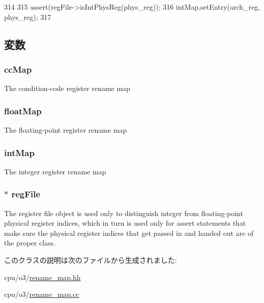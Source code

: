 \begin{DoxyCode}
314     {
315         assert(regFile->isIntPhysReg(phys_reg));
316         intMap.setEntry(arch_reg, phys_reg);
317     }
\end{DoxyCode}


\subsection{変数}
\hypertarget{classUnifiedRenameMap_a763b488cc757601419547ab2420f4fca}{
\subsubsection[{ccMap}]{ {\bf ccMap}}}
\label{classUnifiedRenameMap_a763b488cc757601419547ab2420f4fca}
The condition-\/code register rename map \hypertarget{classUnifiedRenameMap_a0850a3bd98051c123507bd1d971f5ea5}{
\subsubsection[{floatMap}]{ {\bf floatMap}}}
\label{classUnifiedRenameMap_a0850a3bd98051c123507bd1d971f5ea5}
The floating-\/point register rename map \hypertarget{classUnifiedRenameMap_a3133c6b943f6bd39859ab4544cb8099e}{
\subsubsection[{intMap}]{ {\bf intMap}}}
\label{classUnifiedRenameMap_a3133c6b943f6bd39859ab4544cb8099e}
The integer register rename map \hypertarget{classUnifiedRenameMap_a1cb63957414a6c5533e779b0e6e68dd7}{
\subsubsection[{regFile}]{$\ast$ {\bf regFile}}}
\label{classUnifiedRenameMap_a1cb63957414a6c5533e779b0e6e68dd7}
The register file object is used only to distinguish integer from floating-\/point physical register indices, which in turn is used only for assert statements that make sure the physical register indices that get passed in and handed out are of the proper class. 

このクラスの説明は次のファイルから生成されました:\begin{DoxyCompactItemize}
\item 
cpu/o3/\hyperlink{rename__map_8hh}{rename\_\-map.hh}\item 
cpu/o3/\hyperlink{rename__map_8cc}{rename\_\-map.cc}\end{DoxyCompactItemize}
